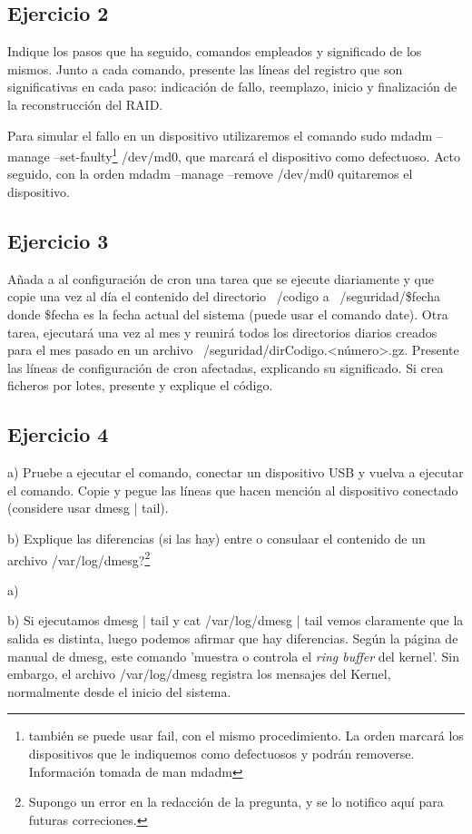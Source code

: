 \documentclass[a4paper, 11pt]{article} %
\begin{document}
\subsection{Ejercicio 2}
Indique los pasos que ha seguido, comandos empleados y significado de los mismos. Junto a cada comando, presente las líneas del registro que son significativas en cada paso: indicación de fallo, reemplazo, inicio y finalización de la reconstrucción del RAID.

Para simular el fallo en un dispositivo utilizaremos el comando sudo mdadm --manage --set-faulty\footnote{también se puede usar fail, con el mismo procedimiento. La orden marcará los dispositivos que le indiquemos como defectuosos y podrán removerse. Información tomada de man mdadm} /dev/md0, que marcará el dispositivo como defectuoso. Acto seguido, con la orden mdadm --manage --remove /dev/md0 quitaremos el dispositivo. 


\subsection{Ejercicio 3}
Añada a al configuración de cron una tarea que se ejecute diariamente y que copie una vez al día el contenido del directorio ~/codigo a ~/seguridad/\$fecha donde \$fecha es la fecha actual del sistema (puede usar el comando date). Otra tarea, ejecutará una vez al mes y reunirá todos los directorios diarios creados para el mes pasado en un archivo ~/seguridad/dirCodigo.<número>.gz. Presente las líneas de configuración de cron afectadas, explicando su significado. Si crea ficheros por lotes, presente y explique el código. 

\subsection{Ejercicio 4}
a) Pruebe a ejecutar el comando, conectar un dispositivo USB y vuelva a ejecutar el comando. Copie y pegue las líneas que hacen mención al dispositivo conectado (considere usar dmesg | tail). 

b) Explique las diferencias (si las hay) entre o consulaar el contenido de un archivo /var/log/dmesg?\footnote{Supongo un error en la redacción de la pregunta, y se lo notifico aquí para futuras correciones.}


a) 

b) Si ejecutamos dmesg | tail y cat /var/log/dmesg | tail vemos claramente que la salida es distinta, luego podemos afirmar que hay diferencias. Según la página de manual de dmesg, este comando 'muestra o controla el \textit{ring buffer} del kernel'. Sin embargo, el archivo /var/log/dmesg registra los mensajes del Kernel, normalmente desde el inicio del sistema.
\end{document}
